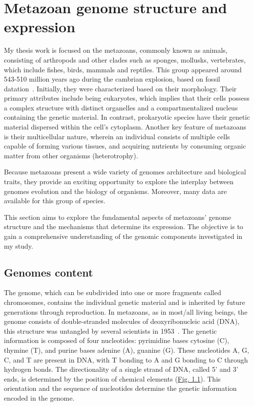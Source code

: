 \thispagestyle{empty}
\chapter{Metazoan genome structure and expression}
\vspace*{-10pt}
{\hypersetup{linkcolor=GREYDARK}\minitoc}
\label{chap:intro-metazoan_genome}

My thesis work is focused on the metazoans, commonly known as animals, consisting of arthropods and other clades such as sponges, mollusks, vertebrates, which include fishes, birds, mammals and reptiles. This group appeared around 543-510 million years ago during the cambrian explosion, based on fossil datation~\citep{tikhonenkov_insights_2020}.
Initially, they were characterized based on their morphology. Their primary attributes include being eukaryotes, which implies that their cells possess a complex structure with distinct organelles and a compartmentalized nucleus containing the genetic material. In contrast, prokaryotic species have their genetic material dispersed within the cell's cytoplasm. Another key feature of metazoans is their multicellular nature, wherein an individual consists of multiple cells capable of forming various tissues, and acquiring nutrients by consuming organic matter from other organisms (heterotrophy).

Because metazoans present a wide variety of genomes architecture and biological traits, they provide an exciting opportunity to explore the interplay between genomes evolution and the biology of organisms. Moreover, many data are available for this group of species. 

This section aims to explore the fundamental aspects of metazoans' genome structure and the mechanisms that determine its expression. The objective is to gain a comprehensive understanding of the genomic components investigated in my study.


\section{Genomes content}

The genome, which can be subdivided into one or more fragments called chromosomes, contains the individual genetic material and is inherited by future generations through reproduction. In metazoans, as in most/all living beings, the genome consists of double-stranded molecules of deoxyribonucleic acid (\acrshort{DNA}), this structure was untangled by several scientists in 1953~\citep{franklin_molecular_1953, watson_molecular_1953, wilkins_molecular_1953}. The genetic information is composed of four nucleotides: pyrimidine bases cytosine (\acrshort{C}), thymine (\acrshort{T}), and purine bases adenine (\acrshort{A}), guanine (\acrshort{G}). These nucleotides \acrshort{A}, \acrshort{G}, \acrshort{C}, and \acrshort{T} are present in \acrshort{DNA}, with \acrshort{T} bonding to \acrshort{A} and \acrshort{G} bonding to \acrshort{C} through hydrogen bonds. The directionality of a single strand of \acrshort{DNA}, called 5' and 3' ends, is determined by the position of chemical elements (\hyperref[fig:dnamolecule]{Fig. 1.1}). This orientation and the sequence of nucleotides determine the genetic information encoded in the genome.

